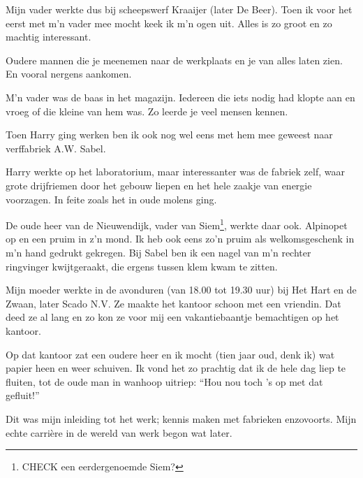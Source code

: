 \documentclass[10pt,twoside,openright]{memoir}
\begin{document}
Mijn vader werkte dus bij scheepswerf Kraaijer (later De Beer). Toen ik voor het eerst met m’n vader mee mocht keek ik m’n ogen uit. Alles is zo groot en zo machtig interessant.

Oudere mannen die je meenemen naar de werkplaats en je van alles laten zien. En vooral nergens aankomen. 

M’n vader was de baas in het magazijn. Iedereen die iets nodig had klopte aan en vroeg of die kleine van hem was. Zo leerde je veel mensen kennen. 




Toen Harry ging werken ben ik ook nog wel eens met hem mee geweest naar verffabriek A.W. Sabel. 

Harry werkte op het laboratorium, maar interessanter was de fabriek zelf, waar grote drijfriemen door het gebouw liepen en het hele zaakje van energie voorzagen. In feite zoals het in oude molens ging.

De oude heer van de Nieuwendijk, vader van Siem\footnote{CHECK een eerdergenoemde Siem?}, werkte daar ook. Alpinopet op en een pruim in z’n mond. Ik heb ook eens zo’n pruim als welkomsgeschenk in m’n hand gedrukt gekregen. Bij Sabel ben ik een nagel van m’n rechter ringvinger kwijtgeraakt, die ergens tussen klem kwam te zitten.

Mijn moeder werkte in de avonduren (van 18.00 tot 19.30 uur) bij Het Hart en de Zwaan, later Scado N.V. Ze maakte het kantoor schoon met een vriendin. Dat deed ze al lang en zo kon ze voor mij een vakantiebaantje bemachtigen op het kantoor. 

Op dat kantoor zat een oudere heer en ik mocht (tien jaar oud, denk ik) wat papier heen en weer schuiven. Ik vond het zo prachtig dat ik de hele dag liep te fluiten, tot de oude man in wanhoop uitriep: ``Hou nou toch ’s op met dat gefluit!''

Dit was mijn inleiding tot het werk; kennis maken met fabrieken enzovoorts. Mijn echte carrière in de wereld van werk begon wat later.
\end{document}
